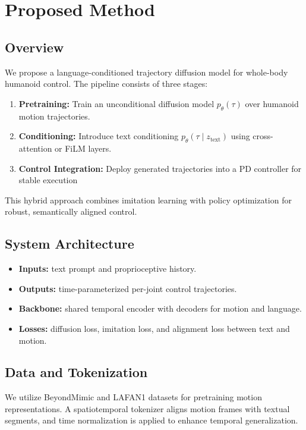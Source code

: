 \section{Proposed Method}
\label{sec:method}

\subsection{Overview}

We propose a language-conditioned trajectory diffusion model for whole-body humanoid control. 
The pipeline consists of three stages:

\begin{enumerate}
    \item \textbf{Pretraining:} Train an unconditional diffusion model $p_\theta(\tau)$ over humanoid motion trajectories.
    \item \textbf{Conditioning:} Introduce text conditioning $p_\theta(\tau \mid z_{\text{text}})$ using cross-attention or FiLM layers.
    \item \textbf{Control Integration:} Deploy generated trajectories into a PD controller for stable execution
\end{enumerate}

This hybrid approach combines imitation learning with policy optimization for robust, semantically aligned control.

\subsection{System Architecture}

\begin{itemize}
    \item \textbf{Inputs:} text prompt and proprioceptive history.
    \item \textbf{Outputs:} time-parameterized per-joint control trajectories.
    \item \textbf{Backbone:} shared temporal encoder with decoders for motion and language.
    \item \textbf{Losses:} diffusion loss, imitation loss, and alignment loss between text and motion.
\end{itemize}

\subsection{Data and Tokenization}

We utilize BeyondMimic \cite{liao2025beyondmimicmotiontrackingversatile} and LAFAN1 \cite{harvey2020robust} datasets for pretraining motion representations. 
A spatiotemporal tokenizer aligns motion frames with textual segments, and time normalization is applied to enhance temporal generalization.

